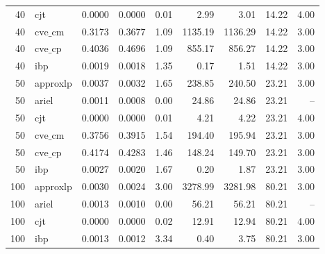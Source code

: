 \documentclass{article}
\begin{document}
\begin{table}[ht]
\begin{tabular}{rlrrrrrrr}
 40 & cjt & 0.0000 & 0.0000 & 0.01 & 2.99 & 3.01 & 14.22 & 4.00 \\
 40 & $\text{cve\_cm}$ & 0.3173 & 0.3677 & 1.09 & 1135.19 & 1136.29 & 14.22 & 3.00 \\
 40 & $\text{cve\_cp}$ & 0.4036 & 0.4696 & 1.09 & 855.17 & 856.27 & 14.22 & 3.00 \\
 40 & ibp & 0.0019 & 0.0018 & 1.35 & 0.17 & 1.51 & 14.22 & 3.00 \\
\hline
 50 & approxlp & 0.0037 & 0.0032 & 1.65 & 238.85 & 240.50 & 23.21 & 3.00 \\
 50 & ariel & 0.0011 & 0.0008 & 0.00 & 24.86 & 24.86 & 23.21 & -- \\
 50 & cjt & 0.0000 & 0.0000 & 0.01 & 4.21 & 4.22 & 23.21 & 4.00 \\
 50 & $\text{cve\_cm}$ & 0.3756 & 0.3915 & 1.54 & 194.40 & 195.94 & 23.21 & 3.00 \\
 50 & $\text{cve\_cp}$ & 0.4174 & 0.4283 & 1.46 & 148.24 & 149.70 & 23.21 & 3.00 \\
 50 & ibp & 0.0027 & 0.0020 & 1.67 & 0.20 & 1.87 & 23.21 & 3.00 \\
\hline
 100 & approxlp & 0.0030 & 0.0024 & 3.00 & 3278.99 & 3281.98 & 80.21 & 3.00 \\
 100 & ariel & 0.0013 & 0.0010 & 0.00 & 56.21 & 56.21 & 80.21 & -- \\
 100 & cjt & 0.0000 & 0.0000 & 0.02 & 12.91 & 12.94 & 80.21 & 4.00 \\
 100 & ibp & 0.0013 & 0.0012 & 3.34 & 0.40 & 3.75 & 80.21 & 3.00 \\
\bottomrule
\end{tabular}
\end{table}
\end{document}
